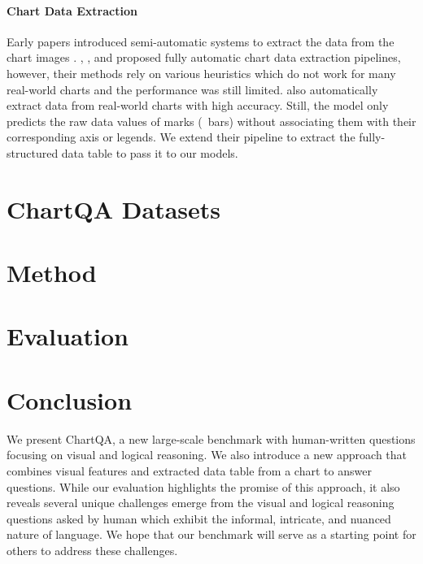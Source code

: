 \documentclass[11pt]{article}
\newcommand{\change}[1]{{\leavevmode\color{black}#1}}%
\begin{document}
\paragraph{Chart Data Extraction}
Early papers introduced semi-automatic systems to extract the data from the chart images \cite{Revision, chartsense}. \citet{Choi2019VisualizingFT}, \citet{Liu2019DataEF}\change{, and \cite{Siegel2016FigureSeerPR} }proposed fully automatic chart data extraction pipelines, however, their methods rely on various heuristics which do not work for many real-world charts and the performance was still limited. \citet{ChartOCR} also automatically
extract data from real-world charts with high accuracy. Still, the model only predicts the raw data values of marks (\eg\ bars) without associating them with their corresponding axis or legends. We extend their pipeline to extract the fully-structured data table to pass it to our models.

\section{ChartQA Datasets}


%

\section{Method}



\section{Evaluation}

\section{Conclusion}
We present ChartQA, a new large-scale benchmark with human-written questions focusing on visual and logical reasoning. We also introduce a new approach that combines visual features and extracted data table from a chart to answer questions. While our evaluation highlights the promise of this approach, it also reveals several unique challenges emerge from the  visual and logical reasoning questions asked by human which exhibit the informal, intricate, and nuanced nature of language. We hope that our benchmark  will serve as a starting point for others to address these challenges.
\end{document}
